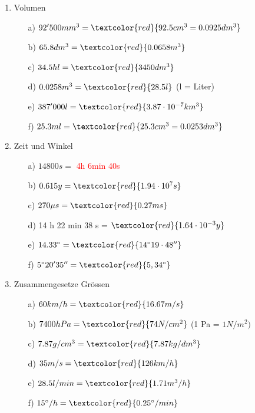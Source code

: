 \documentclass[11pt, a4paper, twoside, fleqn]{article}
\begin{document}
\begin{enumerate}[itemsep=1ex, leftmargin=*]
\begin{enumerate}[itemsep=2mm]
    \end{enumerate}
\item Volumen 
    \begin{enumerate}[itemsep=2mm]
        \item[a)] $ 92'500 mm^{3} = \textcolor{red}{92.5 cm^{3} = 0.0925 dm^{3}} $
        \item[b)] $ 65.8 dm^{3} = \textcolor{red}{0.0658 m^{3}} $
        \item[c)] $ 34.5 hl = \textcolor{red}{3450 dm^{3}} $
        \item[d)] $ 0.0258 m^{3} = \textcolor{red}{28.5 l} $ (l = Liter)
        \item[e)] $ 387'000 l = \textcolor{red}{3.87 \cdot 10^{-7} km^{3}} $
        \item[f)] $ 25.3 ml = \textcolor{red}{25.3 cm^{3} = 0.0253 dm^{3}} $
    \end{enumerate}
\newpage
\item Zeit und Winkel
 \begin{enumerate}[itemsep=2mm]
     \item[a)] $ 14800 s = $ \textcolor{red}{4h 6min 40s}
     \item[b)] $ 0.615 y = \textcolor{red}{1.94 \cdot10^{7} s} $
     \item[c)] $ 270 \mu s =  \textcolor{red}{0.27 ms} $
     \item[d)] 14 h 22 min 38 s = $\textcolor{red}{1.64 \cdot 10^{-3} y} $
     \item[e)] $ 14.33 ^{\circ} = \textcolor{red}{14 ^{\circ} 19 \cdot 48''}$ 
    \item[f)] $ 5 ^{\circ} 20' 35'' = \textcolor{red}{5,34 ^{\circ}} $
 \end{enumerate}
 \item Zusammengesetze Grössen
    \begin{enumerate}[itemsep=2mm]
        \item [a)] $ 60 km/h = \textcolor{red}{16.67 m/s} $
        \item[b)] $ 7400 hPa = \textcolor{red}{74 N/cm^{2}} $ (1 Pa = $1 N/m^{2}) $ 
        \item[c)] $ 7.87 g/cm^{3} = \textcolor{red}{7.87 kg/dm^{3}} $
        \item[d)] $ 35 m/s = \textcolor{red}{126 km/h} $
        \item[e)] $ 28.5 l/min = \textcolor{red}{1.71 m^{3} / h} $
        \item[f)] $ 15 ^{\circ} /h = \textcolor{red}{0.25 ^{\circ} / min} $
    \end{enumerate}

\end{enumerate}
\end{document}
